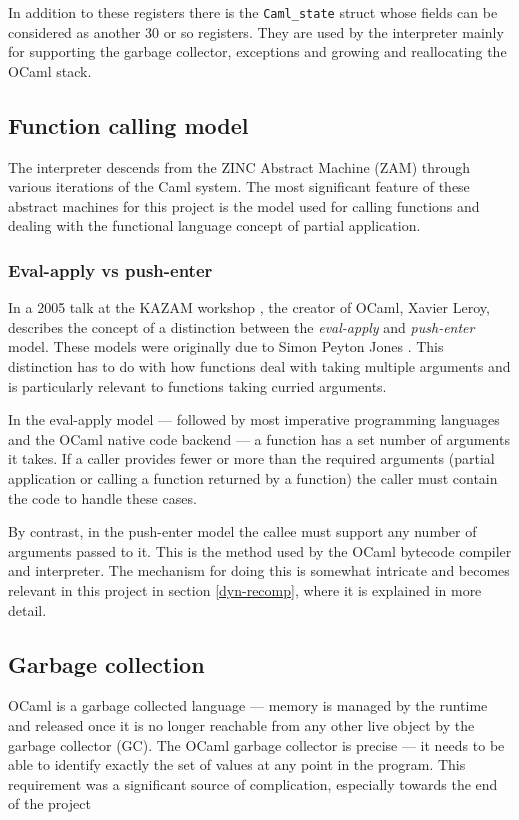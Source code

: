 In addition to these registers there is the \texttt{Caml\_state} struct whose fields can be
considered as another 30 or so registers. They are used by the interpreter mainly for supporting
the garbage collector, exceptions and growing and reallocating the OCaml stack.

\subsection{Function calling model}

The interpreter descends from the ZINC Abstract Machine (ZAM) \cite{zinc} through various
iterations of the Caml system. The most significant feature of these abstract machines for this
project is the model used for calling functions and dealing with the functional language concept
of partial application.

\subsubsection{Eval-apply vs push-enter}

In a 2005 talk at the KAZAM workshop \cite{xavtalk}, the creator of OCaml, Xavier Leroy, describes
the concept of a distinction between the \emph{eval-apply} and \emph{push-enter} model.
These models were originally due to Simon Peyton Jones \cite{jones}\cite{marlow-jones}. This
distinction has to do with how functions deal with taking multiple arguments and is particularly
relevant to functions taking curried arguments.

In the eval-apply model --- followed by most imperative programming languages and the OCaml native
code backend --- a function has a set number of arguments it takes. If a caller
provides fewer or more than the required arguments (partial application or calling a function
returned by a function) the caller must contain the code to handle these cases.

By contrast, in the push-enter model the callee must support any number of arguments passed to it.
This is the method used by the OCaml bytecode compiler and interpreter. The mechanism for doing
this is somewhat intricate and becomes relevant in this project in section \ref{dyn-recomp}, where
it is explained in more detail.

\subsection{Garbage collection}

OCaml is a garbage collected language --- memory is managed by the runtime and released once it is
no longer reachable from any other live object by the garbage collector (GC). The OCaml garbage
collector is precise --- it needs to be able to identify exactly the set of values at any point in
the program. This requirement was a significant source of complication, especially towards the end
of the project

